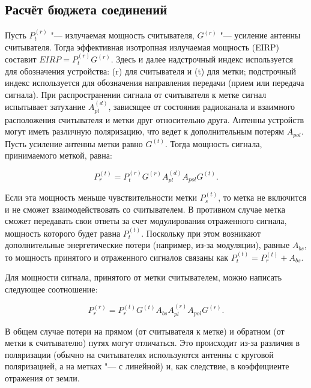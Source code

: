 \subsection{Расчёт бюджета соединений}
Пусть $P_t^{(r)}$ "--- излучаемая мощность считывателя, $G^{(r)}$ "--- усиление антенны считывателя. Тогда эффективная изотропная излучаемая мощность (EIRP) составит $EIRP =  P_t^{(r)} G^{(r)}$. Здесь и далее надстрочный индекс используется для обозначения устройства: (r) для считывателя и (t) для метки; подстрочный индекс используется для обозначения направления передачи (прием или передача сигнала). При распространении сигнала от считывателя к метке сигнал испытывает затухание $A_{pl}^{(d)}$, зависящее от состояния радиоканала и взаимного расположения считывателя и метки друг относительно друга. Антенны устройств могут иметь различную поляризацию, что ведет к дополнительным потерям $A_{pol}$. Пусть усиление антенны метки равно $G^{(t)}$. Тогда мощность сигнала, принимаемого меткой, равна:

$$
	P_r^{(t)} = P_t^{(r)} G^{(r)} A_{pl}^{(d)} A_{pol} G^{(t)}.
$$

Если эта мощность меньше чувствительности метки $P_s^{(t)}$, то метка не включится и не сможет взаимодействовать со считывателем. В противном случае метка сможет передавать свои ответы за счет модулирования отраженного сигнала, мощность которого будет равна $P_t^{(t)}$. Поскольку при этом возникают дополнительные энергетические потери (например, из-за модуляции), равные $A_{bs}$, то мощность принятого и отраженного сигналов связаны как $P_t^{(t)} = P_r^{(t)} + A_{bs}$. 

Для мощности сигнала, принятого от метки считывателем, можно написать следующее соотношение:

$$
	P_r^{(r)} = P_r^{(t)} G^{(t)} A_{bs} A_{pl}^{(r)} A_{pol} G^{(r)}.
$$

В общем случае потери на прямом (от считывателя к метке) и обратном (от метки к считывателю) путях могут отличаться. Это происходит из-за различия в поляризации (обычно на считывателях используются антенны с круговой поляризацией, а на метках "--- с линейной) и, как следствие, в коэффициенте отражения от земли.

